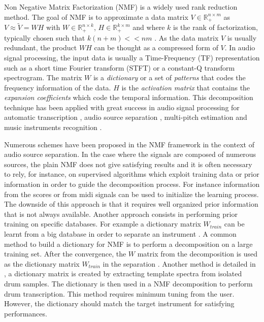\documentclass[journal]{IEEEtran}
\begin{document}
Non Negative Matrix Factorization (NMF) is a widely used rank reduction method. The goal of NMF is to approximate a data matrix $V \in \mathbb{R}_{+}^{n \times m} $ as $V \approx \tilde{V} = WH$ with $W \in \mathbb{R}_{+}^{n \times k}$, $H \in \mathbb{R}_{+}^{k \times m}$ and where $k$ is the rank of factorization, typically chosen such that \mbox{$k(n+m) << nm  $} \cite{lee99}. As the data matrix $V$ is usually redundant, the product $WH$ can be thought as a compressed form of $V$. In audio signal processing, the input data is usually a Time-Frequency (TF) representation such as a short time Fourier transform (STFT) or a constant-Q transform spectrogram. The matrix $W$ is a {\em dictionary} or a set of {\em patterns} that codes the frequency information of the data. $H$ is the {\em activation matrix} that contains the {\em expansion coefficients} which code the temporal information.
This decomposition technique has been applied with great success in audio signal processing for automatic transcription \cite{EwertM12,NB:ICASSP-07}, audio source separation \cite{HennequinDAFx2010,JLD:TASLP10}, multi-pitch estimation \cite{raczynski2007multipitch} and music instruments recognition \cite{cichocki2009nonnegative}.

Numerous schemes have been proposed in the NMF framework in the context of audio source separation. In the case where the signals are composed of numerous sources, the plain NMF does not give satisfying results and it is often necessary to rely, for instance, on supervised algorithms which exploit training data or prior information in order to guide the decomposition process. For instance information from the scores or from midi signals \cite{EwertM12} can be used to initialize the learning process. The downside of this approach is that it requires well organized prior information that is not always available. Another approach consists in performing prior training on specific databases. For example a dictionary matrix $W_{train}$ can be learnt from a big database in order to separate an instrument \cite{jaureguiberry2011adaptation,wudrum}. A common method to build a dictionary for NMF is to perform a decomposition on a large training set. After the convergence, the $W$ matrix from the decomposition is used as the dictionary matrix $W_{train}$ in the separation \cite{jaureguiberry2011adaptation}. Another method is detailed in \cite{wudrum}, a dictionary matrix is created by extracting template spectra from isolated drum samples. The dictionary is then used in a NMF decomposition to perform drum transcription. This method requires minimum tuning from the user. However, the dictionary should match the target instrument for satisfying performances. 
\end{document}
